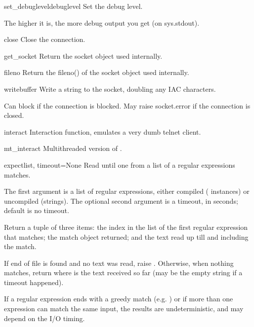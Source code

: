 \begin{methoddesc}[Telnet]{set_debuglevel}{debuglevel}
Set the debug level.

The higher it is, the more debug output you get (on sys.stdout).
\end{methoddesc}

\begin{methoddesc}[Telnet]{close}{}
Close the connection.
\end{methoddesc}

\begin{methoddesc}[Telnet]{get_socket}{}
Return the socket object used internally.
\end{methoddesc}

\begin{methoddesc}[Telnet]{fileno}{}
Return the fileno() of the socket object used internally.
\end{methoddesc}

\begin{methoddesc}[Telnet]{write}{buffer}
Write a string to the socket, doubling any IAC characters.

Can block if the connection is blocked.  May raise
socket.error if the connection is closed.
\end{methoddesc}

\begin{methoddesc}[Telnet]{interact}{}
Interaction function, emulates a very dumb telnet client.
\end{methoddesc}

\begin{methoddesc}[Telnet]{mt_interact}{}
Multithreaded version of .
\end{methoddesc}

\begin{methoddesc}[Telnet]{expect}{list, timeout=None}
Read until one from a list of a regular expressions matches.

The first argument is a list of regular expressions, either
compiled ( instances) or uncompiled (strings).
The optional second argument is a timeout, in seconds; default
is no timeout.

Return a tuple of three items: the index in the list of the
first regular expression that matches; the match object
returned; and the text read up till and including the match.

If end of file is found and no text was read, raise
.  Otherwise, when nothing matches, return
 where  is the text received so
far (may be the empty string if a timeout happened).

If a regular expression ends with a greedy match (e.g. )
or if more than one expression can match the same input, the
results are undeterministic, and may depend on the I/O timing.
\end{methoddesc}

